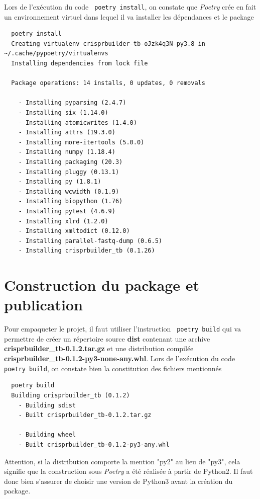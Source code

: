 \documentclass[twoside,a4paper,11pt,frenchb,openany]{report}
\begin{document}
Lors de l'exécution du code \texttt{ poetry install}, on constate que \textit{Poetry} crée en fait un environnement virtuel dans lequel il va installer les dépendances et le package

\begin{verbatim}  poetry install
  Creating virtualenv crisprbuilder-tb-oJzk4q3N-py3.8 in ~/.cache/pypoetry/virtualenvs
  Installing dependencies from lock file

  Package operations: 14 installs, 0 updates, 0 removals

    - Installing pyparsing (2.4.7)
    - Installing six (1.14.0)
    - Installing atomicwrites (1.4.0)
    - Installing attrs (19.3.0)
    - Installing more-itertools (5.0.0)
    - Installing numpy (1.18.4)
    - Installing packaging (20.3)
    - Installing pluggy (0.13.1)
    - Installing py (1.8.1)
    - Installing wcwidth (0.1.9)
    - Installing biopython (1.76)
    - Installing pytest (4.6.9)
    - Installing xlrd (1.2.0)
    - Installing xmltodict (0.12.0)
    - Installing parallel-fastq-dump (0.6.5)
    - Installing crisprbuilder_tb (0.1.26)\end{verbatim}



\section{Construction du package et publication}

Pour empaqueter le projet, il faut utiliser l’instruction
\texttt{ poetry build}
qui va permettre de créer un répertoire source \textbf{dist} contenant une archive \textbf{crisprbuilder\_tb-0.1.2.tar.gz} et une distribution compilée \textbf{crisprbuilder\_tb-0.1.2-py3-none-any.whl}. Lors de l'exécution du code \texttt{ poetry build}, on constate bien la constitution des fichiers mentionnés

\begin{verbatim}  poetry build
  Building crisprbuilder_tb (0.1.2)
    - Building sdist
    - Built crisprbuilder_tb-0.1.2.tar.gz

    - Building wheel
    - Built crisprbuilder_tb-0.1.2-py3-any.whl\end{verbatim}

Attention, si la distribution comporte la mention "py2" au lieu de "py3", cela signifie que la construction sous \textit{Poetry} a été réalisée à partir de Python2. Il faut donc bien s'assurer de choisir une version de Python3 avant la création du package.
\end{document}
